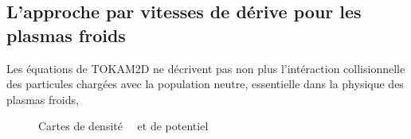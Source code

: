 \begin{refsection}
\section{L'approche par vitesses de dérive pour les plasmas
froids}
\label{vitessesDerivePlasmaFroid}
Les équations de TOKAM2D ne décrivent pas non plus l'intéraction
collisionnelle des particules chargées avec la population neutre, essentielle dans la physique des plasmas froids,
\begin{figure}[htbp]
    \centering
    \caption{Cartes de densité ~~et de potentiel
    }
    \label{2-CartesWithTe}
	\end{figure}
%
%

\end{refsection}




